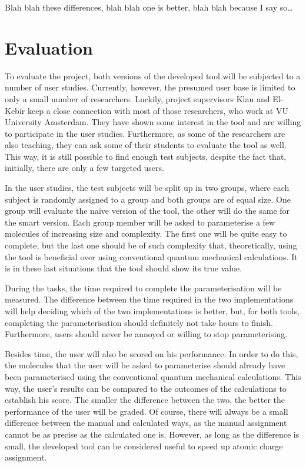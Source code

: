 Blah blah these differences, blah blah one is better, blah blah because I say so\ldots


\section{Evaluation}

To evaluate the project, both versions of the developed tool will be subjected to a number of user studies. Currently, however, the presumed user base is limited to only a small number of researchers. Luckily, project supervisors Klau and El-Kebir keep a close connection with most of those researchers, who work at VU University Amsterdam. They have shown some interest in the tool and are willing to participate in the user studies. Furthermore, as some of the researchers are also teaching, they can ask some of their students to evaluate the tool as well. This way, it is still possible to find enough test subjects, despite the fact that, initially, there are only a few targeted users.

In the user studies, the test subjects will be split up in two groups, where each subject is randomly assigned to a group and both groups are of equal size. One group will evaluate the naive version of the tool, the other will do the same for the smart version. Each group member will be asked to parameterise a few molecules of increasing size and complexity. The first one will be quite easy to complete, but the last one should be of such complexity that, theoretically, using the tool is beneficial over using conventional quantum mechanical calculations. It is in these last situations that the tool should show its true value.

During the tasks, the time required to complete the parameterisation will be measured. The difference between the time required in the two implementations will help deciding which of the two implementations is better, but, for both tools, completing the parameterisation should definitely not take hours to finish. Furthermore, users should never be annoyed or willing to stop parameterising.

Besides time, the user will also be scored on his performance. In order to do this, the molecules that the user will be asked to parameterise should already have been parameterised using the conventional quantum mechanical calculations. This way, the user's results can be compared to the outcomes of the calculations to establish his score. The smaller the difference between the two, the better the performance of the user will be graded. Of course, there will always be a small difference between the manual and calculated ways, as the manual assignment cannot be as precise as the calculated one is. However, as long as the difference is small, the developed tool can be considered useful to speed up atomic charge assignment.

